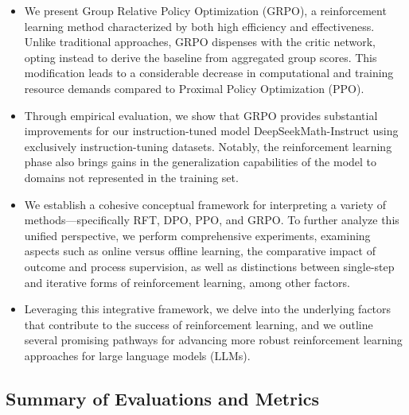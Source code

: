 \begin{itemize}[topsep=0pt]
    \item We present Group Relative Policy Optimization (GRPO), a reinforcement learning method characterized by both high efficiency and effectiveness. Unlike traditional approaches, GRPO dispenses with the critic network, opting instead to derive the baseline from aggregated group scores. This modification leads to a considerable decrease in computational and training resource demands compared to Proximal Policy Optimization (PPO).
    \item Through empirical evaluation, we show that GRPO provides substantial improvements for our instruction-tuned model DeepSeekMath-Instruct using exclusively instruction-tuning datasets. Notably, the reinforcement learning phase also brings gains in the generalization capabilities of the model to domains not represented in the training set.
    \item We establish a cohesive conceptual framework for interpreting a variety of methods—specifically RFT, DPO, PPO, and GRPO. To further analyze this unified perspective, we perform comprehensive experiments, examining aspects such as online versus offline learning, the comparative impact of outcome and process supervision, as well as distinctions between single-step and iterative forms of reinforcement learning, among other factors.
    \item Leveraging this integrative framework, we delve into the underlying factors that contribute to the success of reinforcement learning, and we outline several promising pathways for advancing more robust reinforcement learning approaches for large language models (LLMs).
\end{itemize}

\subsection{Summary of Evaluations and Metrics}

